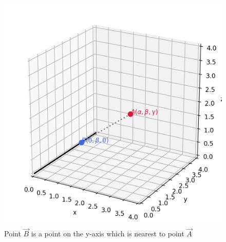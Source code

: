 \documentclass[journal]{IEEEtran}
\begin{document}
\begin{figure}[htbp]
    \centering
    \includegraphics[width=\columnwidth]{figs/fig1.png}
    \caption{Point $\vec{B}$ is a point on the y-axis which is nearest to point $\vec{A}$}
    \label{fig:fig/fig1.png}
\end{figure}
\end{document}
